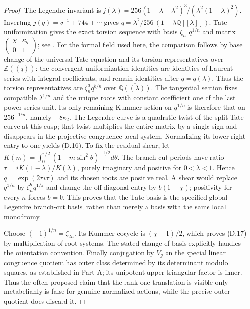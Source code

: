 \begin{proof}
The Legendre invariant is
$j(\lambda)=256(1-\lambda+\lambda^2)^3/(\lambda^2(1-\lambda)^2)$.
Inverting $j(q)=q^{-1}+744+\cdots$ gives
$q=\lambda^2/256\,(1+\lambda\mathbb Q[[\lambda]])$.
Tate uniformization gives the exact torsion sequence with basis $\zeta_n,q^{1/n}$ and matrix $\left(\begin{smallmatrix}\chi&\kappa_q\\0&1\end{smallmatrix}\right)$; see \cite[\S11, Theorem 11.17 and the preceding uniformization]{dJoshiTate}. For the formal field used here, the comparison follows by base change of the universal Tate equation and its torsion representatives over $\mathbb Z((q))$: the convergent uniformization identities are identities of Laurent series with integral coefficients, and remain identities after $q=q(\lambda)$. Thus the torsion representatives are $\zeta_n^a q^{b/n}$ over $\overline{\mathbb Q((\lambda))}$. The tangential section fixes compatible $\lambda^{1/n}$ and the unique roots with constant coefficient one of the last power-series unit. Its only remaining Kummer action on $q^{1/n}$ is therefore that on $256^{-1/n}$, namely $-8\kappa_2$. The Legendre curve is a quadratic twist of the split Tate curve at this cusp; that twist multiplies the entire matrix by a single sign and disappears in the projective congruence local system. Normalizing its lower-right entry to one yields (D.16). To fix the residual shear, let $K(m)=\int_0^{\pi/2}(1-m\sin^2\theta)^{-1/2}d\theta$. The branch-cut periods have ratio $\tau=iK(1-\lambda)/K(\lambda)$, purely imaginary and positive for $0<\lambda<1$. Hence $q=\exp(2\pi i\tau)$ and its chosen roots are positive real. A shear would replace $q^{1/n}$ by $\zeta_n^b q^{1/n}$ and change the off-diagonal entry by $b(1-\chi)$; positivity for every $n$ forces $b=0$. This proves that the Tate basis is the specified global Legendre branch-cut basis, rather than merely a basis with the same local monodromy.

Choose $(-1)^{1/n}=\zeta_{2n}$. Its Kummer cocycle is $(\chi-1)/2$, which proves (D.17) by multiplication of root systems. The stated change of basis explicitly handles the orientation convention. Finally conjugation by $V_g$ on the special linear congruence quotient has outer class determined by its determinant modulo squares, as established in Part A; its unipotent upper-triangular factor is inner. Thus the often proposed claim that the rank-one translation is visible only metabelianly is false for genuine normalized actions, while the precise outer quotient does discard it.
\end{proof}

